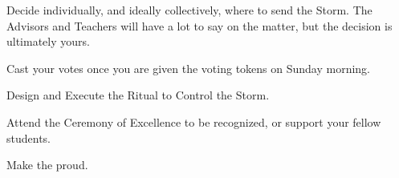\documentclass[blue]{GL2020}
\begin{document}
\begin{itemz}[Goals]
	\item Decide individually, and ideally collectively, where to send the Storm. The Advisors and Teachers will have a lot to say on the matter, but the decision is ultimately yours.
	\item Cast your votes once you are given the voting tokens on Sunday morning.
	\item Design and Execute the Ritual to Control the Storm.
	\item Attend the Ceremony of Excellence to be recognized, or support your fellow students.
	\item Make the \pSc{} proud.
\end{itemz}
\end{document}
